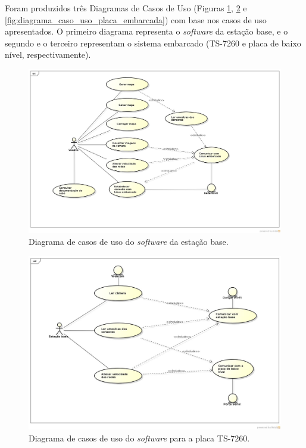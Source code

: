 Foram produzidos três Diagramas de Casos de Uso (Figuras \ref{fig:diagrama_caso_uso_estacao_base}, \ref{fig:diagrama_caso_uso_linux_embarcado} e \ref{fig:diagrama_caso_uso_placa_embarcada}) com base nos casos de uso apresentados. O primeiro diagrama representa o \textit{software} da estação base, e o segundo e o terceiro representam o sistema embarcado (TS-7260 e placa de baixo nível, respectivamente).

\begin{figure}[H]
  \centering
  \includegraphics[width=\textwidth, keepaspectratio]{./figuras/estacaoBase/usecase_estacao_base.jpg}
  \caption{Diagrama de casos de uso do \textit{software} da estação base.}
  \label{fig:diagrama_caso_uso_estacao_base}
\end{figure}

\begin{figure}[H]
  \centering
  \includegraphics[width=\textwidth, keepaspectratio]{./figuras/sistEmbarcado/usecase_linux_embarcado.jpg}
  \caption{Diagrama de casos de uso do \textit{software} para a placa TS-7260.}
  \label{fig:diagrama_caso_uso_linux_embarcado}
\end{figure}

